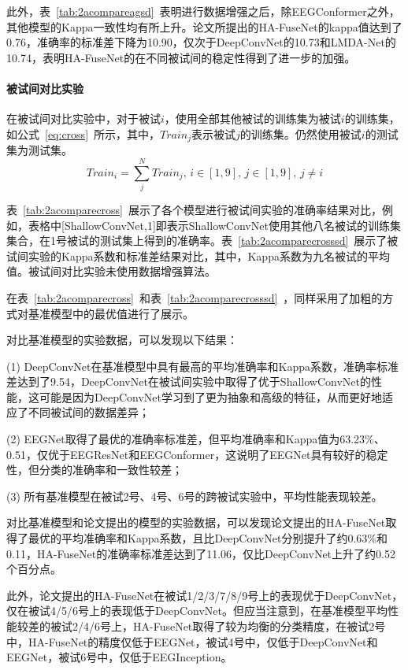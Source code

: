 此外，表~\ref{tab:2acompareagsd}~表明进行数据增强之后，除EEGConformer之外，其他模型的Kappa一致性均有所上升。论文所提出的HA-FuseNet的kappa值达到了0.76，准确率的标准差下降为10.90，仅次于DeepConvNet的10.73和LMDA-Net的10.74，表明HA-FuseNet的在不同被试间的稳定性得到了进一步的加强。

\paragraph{被试间对比实验}

在被试间对比实验中，对于被试\(i\)，使用全部其他被试的训练集为被试\(i\)的训练集，如公式~\ref{eq:cross}~所示，其中，\(Train_j\)表示被试\(j\)的训练集。仍然使用被试\(i\)的测试集为测试集。
\begin{equation}
    \label{eq:cross}
    Train_i=\sum_{j}^{N}Train_j,\,i \in [1,9],\,j \in [1,9],\,j \neq i
\end{equation}

表~\ref{tab:2acomparecross}~展示了各个模型进行被试间实验的准确率结果对比，例如，表格中[ShallowConvNet,1]即表示ShallowConvNet使用其他八名被试的训练集集合，在1号被试的测试集上得到的准确率。表~\ref{tab:2acomparecrosssd}~展示了被试间实验的Kappa系数和标准差结果对比，其中，Kappa系数为九名被试的平均值。被试间对比实验未使用数据增强算法。

在表~\ref{tab:2acomparecross}~和表~\ref{tab:2acomparecrosssd}~，同样采用了加粗的方式对基准模型中的最优值进行了展示。

对比基准模型的实验数据，可以发现以下结果：

(1) DeepConvNet在基准模型中具有最高的平均准确率和Kappa系数，准确率标准差达到了9.54，DeepConvNet在被试间实验中取得了优于ShallowConvNet的性能，这可能是因为DeepConvNet学习到了更为抽象和高级的特征，从而更好地适应了不同被试间的数据差异；

(2) EEGNet取得了最优的准确率标准差，但平均准确率和Kappa值为63.23\%、0.51，仅优于EEGResNet和EEGConformer，这说明了EEGNet具有较好的稳定性，但分类的准确率和一致性较差；

(3) 所有基准模型在被试2号、4号、6号的跨被试实验中，平均性能表现较差。

对比基准模型和论文提出的模型的实验数据，可以发现论文提出的HA-FuseNet取得了最优的平均准确率和Kappa系数，且比DeepConvNet分别提升了约0.63\%和0.11，HA-FuseNet的准确率标准差达到了11.06，仅比DeepConvNet上升了约0.52个百分点。

此外，论文提出的HA-FuseNet在被试1/2/3/7/8/9号上的表现优于DeepConvNet，仅在被试4/5/6号上的表现低于DeepConvNet。但应当注意到，在基准模型平均性能较差的被试2/4/6号上，HA-FuseNet取得了较为均衡的分类精度，在被试2号中，HA-FuseNet的精度仅低于EEGNet，被试4号中，仅低于DeepConvNet和EEGNet，被试6号中，仅低于EEGInception。

